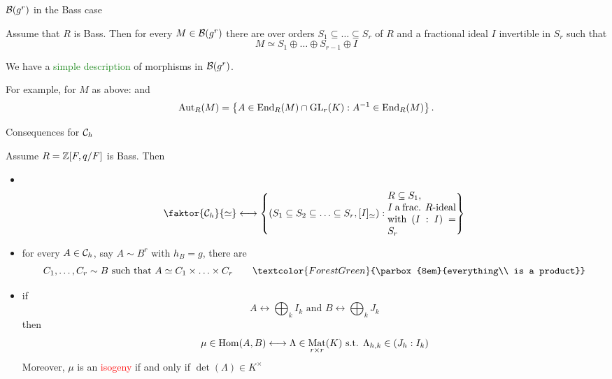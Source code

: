 \documentclass[usenames,dvipsnames]{beamer}
\DeclareMathOperator{\Mat}{Mat}
\newcommand{\red}[1]{\textcolor{red}{#1}}
\newcommand{\green}[1]{\textcolor{ForestGreen}{#1}}
\begin{document}
\begin{frame}{ ${\mathcal B}(g^r)$ in the Bass case }
\begin{corollary}
 Assume that $R$ is Bass. Then for every $M\in {\mathcal B}(g^r)$ there are over orders $S_1\subseteq \ldots \subseteq S_r$ of $R$ and a fractional ideal $I$ invertible in $S_r$ such that
 \[ M\simeq S_1\oplus\ldots\oplus S_{r-1}\oplus I \]
\end{corollary}
  \pause We have a \green{simple description} of morphisms in ${\mathcal B}(g^r)$.

  For example, for $M$ as above:
  \pause {\small
\[ \End_R(M) = 
    \begin{pmatrix}
    S_1 	& S_2 	   & \ldots & S_{r-1} & I \\
    (S_1:S_2) 	& S_2 	   & \ldots & S_{r-1} & I \\
    \vdots 	& \vdots   & \ddots & \vdots  & \vdots \\
    (S_1:S_{r-1}) 	& (S_2:S_{r-1})& \ldots & S_{r-1} & I \\
    (S_1:I) 	& (S_2:I)& \ldots & (S_{r-1}:I) & (I:I)
    \end{pmatrix}
    \]
}
and 
\pause 
\[\operatorname{Aut}_R(M)=\left\lbrace A \in \operatorname{End}_R(M) \cap \operatorname{GL}_r(K) : A^{-1} \in \operatorname{End}_R(M) \right\rbrace.\]
\end{frame}


\begin{frame}{ Consequences for ${\mathcal C}_h$ }
\begin{corollary}
Assume $R=\mathbb{Z}[F,q/F]$ is Bass.
Then
 \begin{itemize}
  \pause \item \ 
  \vspace{-1em}
  \[ \faktor{\cC_h}{ \simeq } \longleftrightarrow \set{ (S_1\subseteq S_2 \subseteq \ldots \subseteq S_r , [I]_{\simeq}) : \parbox{7em}{$R\subseteq S_1$,\\ $I$ a frac. $R$-ideal with $(I:I)=S_r$}  } \]
  \pause \item for every $A\in {\mathcal C}_h$, say $A\sim B^r$ with $h_B=g$, there are 
  \vspace{-1em}
  \[C_1,\ldots,C_r \sim B \text{ such that } A \simeq C_1\times \ldots \times C_r \qquad\green{\parbox{8em}{everything\\ is a product}} \]
  \vspace{-1em}
  \pause \item if 
  \vspace{-1em}
  \[ A \longleftrightarrow \bigoplus_k I_k \text{ and } B \longleftrightarrow \bigoplus_k J_k \]
  \vspace{-1em}
  then 
  \vspace{-1em}
  \[ \mu \in \Hom(A,B) \longleftrightarrow \Lambda \in \Mat_{r\times r}(K) \text{ s.t. } \Lambda_{h,k}\in (J_h:I_k) \]
  \pause Moreover, $\mu$ is an \red{isogeny} if and only if $\det(\Lambda) \in K^\times$
 \end{itemize}
\end{corollary}
\end{frame}
\end{document}
